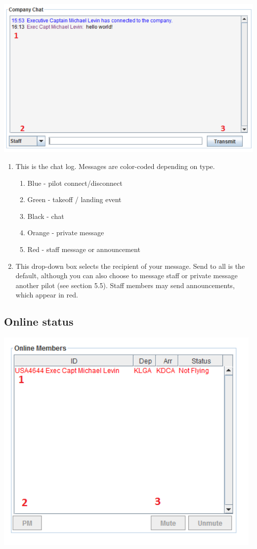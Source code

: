 \documentclass[12pt]{article}
\begin{document}
\begin{center}
\includegraphics[scale=1]{Image9.pdf}
\end{center} 

\begin{enumerate}
\item{This is the chat log. Messages are color-coded depending on type. 
\begin{enumerate}
\item{Blue - pilot connect/disconnect}
\item{Green - takeoff / landing event }
\item{Black - chat }
\item{Orange - private message}
\item{Red - staff message or announcement}
\end{enumerate}
}
\item{This drop-down box selects the recipient of your message. Send to all is the default, although you can also choose to message staff or private message another pilot (see section 5.5). Staff members may send announcements, which appear in red.}
\end{enumerate}

\subsection{Online status}
\begin{center}
\includegraphics[scale=1]{Image10.pdf}
\end{center} 
\end{document}
